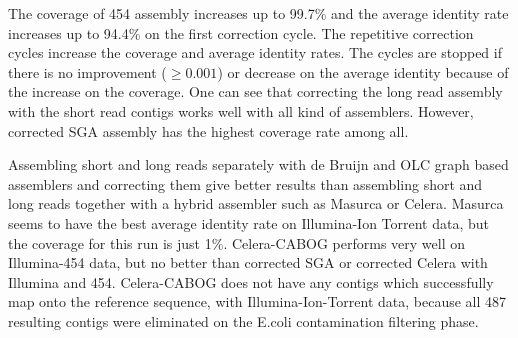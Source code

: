 \documentclass[12pt,a4paper]{cibb}
\begin{document}
The coverage of 454 assembly increases up to 99.7\% and the average identity rate increases up to 94.4\% on the first correction cycle. The repetitive correction cycles increase the coverage and average identity rates. The cycles are stopped if there is no improvement ($\geq 0.001$) or decrease on the average identity because of the increase on the coverage. One can see that correcting the long read assembly with the short read contigs works well with all kind of assemblers. However, corrected SGA assembly has the highest coverage rate among all.

Assembling short and long reads separately with de Bruijn and OLC graph based assemblers and correcting them give better results than assembling short and long reads together with a hybrid assembler such as Masurca or Celera. Masurca seems to have the best average identity rate on Illumina-Ion Torrent data, but the coverage for this run is just 1\%. Celera-CABOG performs very well on Illumina-454 data, but no better than corrected SGA or corrected Celera with Illumina and 454. Celera-CABOG does not have any contigs which successfully map onto the reference sequence, with Illumina-Ion-Torrent data, because all 487 resulting contigs were eliminated on the E.coli contamination filtering phase.
\end{document}

